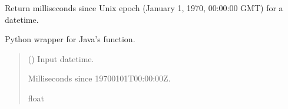 \documentclass[letterpaper,10pt,english]{sphinxmanual}
\begin{document}
\begin{fulllineitems}
\label{\detokenize{apache_commons_validator_python.util:apache_commons_validator_python.util.datetime_helpers.date_get_time}}
\pysigstartsignatures
{}
\pysigstopsignatures
\sphinxAtStartPar
Return milliseconds since Unix epoch (January 1, 1970, 00:00:00 GMT) for a datetime.

\sphinxAtStartPar
Python wrapper for Java’s  function.
\begin{quote}\begin{description}
\sphinxAtStartPar
{} () \textendash{} Input datetime.

\sphinxAtStartPar
Milliseconds since 1970\sphinxhyphen{}01\sphinxhyphen{}01T00:00:00Z.

\sphinxAtStartPar
float

\end{description}\end{quote}

\end{fulllineitems}

\end{document}
